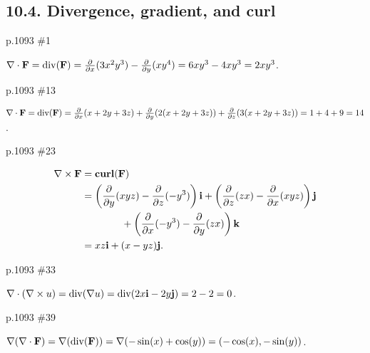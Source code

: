 \subsection{10.4. Divergence, gradient, and curl}
\begin{practice}p.1093 \#1\end{practice}
\begin{pracsol}
  $\nabla\cdot\mathbf F=\operatorname{div}(\mathbf F)=\frac{\partial}{\partial x}(3x^2y^3)-\frac{\partial}{\partial y}(xy^4)=6xy^3-4xy^3=2xy^3$.
\end{pracsol}
\begin{practice}p.1093 \#13\end{practice}
\begin{pracsol}
  $\nabla\cdot\mathbf F=\operatorname{div}(\mathbf F)=\frac{\partial}{\partial x}(x+2y+3z)+\frac{\partial}{\partial y}(2(x+2y+3z))+\frac{\partial}{\partial z}(3(x+2y+3z))=1+4+9=14$.
\end{pracsol}
\begin{practice}p.1093 \#23\end{practice}
\begin{pracsol}
  \[\begin{split}
    \nabla\times \mathbf F &=\operatorname{\mathbf{curl}}(\mathbf F)\\
    &= \left(\frac{\partial}{\partial y}(xyz)-\frac{\partial}{\partial z}(-y^3)\right)\mathbf i+\left(\frac{\partial}{\partial z}(zx)-\frac{\partial}{\partial x}(xyz)\right)\mathbf j\\
    &\qquad\qquad+\left(\frac{\partial}{\partial x}(-y^3)-\frac{\partial}{\partial y}(zx)\right)\mathbf k\\
    &= xz\mathbf i+(x-yz)\mathbf j.
  \end{split}\]
\end{pracsol}
\begin{practice}p.1093 \#33\end{practice}
\begin{pracsol}
  $\nabla\cdot(\nabla\times u)=\operatorname{div}(\nabla u)=\operatorname{div}(2x\mathbf i-2y\mathbf j)=2-2=0$.
\end{pracsol}
\begin{practice}p.1093 \#39\end{practice}
\begin{pracsol}
  $\nabla(\nabla\cdot\mathbf F)=\nabla(\operatorname{div}(\mathbf F))=\nabla(-\sin(x)+\cos(y))=(-\cos(x),-\sin(y))$.
\end{pracsol}

